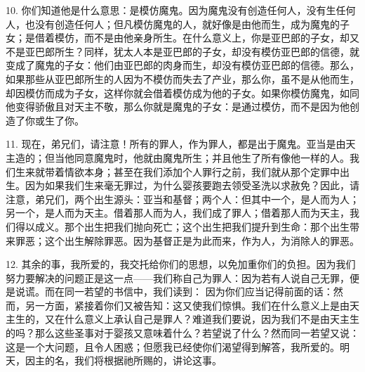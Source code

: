 10.  你们知道他是什么意思：是模仿魔鬼。因为魔鬼没有创造任何人，没有生任何人，也没有创造任何人；但凡模仿魔鬼的人，就好像是由他而生，成为魔鬼的子女；是借着模仿，而不是由他亲身所生。在什么意义上，你是亚巴郎的子女，却又不是亚巴郎所生？同样，犹太人本是亚巴郎的子女，却没有模仿亚巴郎的信德，就变成了魔鬼的子女：他们由亚巴郎的肉身而生，却没有模仿亚巴郎的信德。那么，如果那些从亚巴郎所生的人因为不模仿而失去了产业，那么你，虽不是从他而生，却因模仿而成为子女，这样你就会借着模仿成为他的子女。如果你模仿魔鬼，如同他变得骄傲且对天主不敬，那么你就是魔鬼的子女：是通过模仿，而不是因为他创造了你或生了你。\par

11. 现在，弟兄们，请注意！所有的罪人，作为罪人，都是出于魔鬼。亚当是由天主造的；但当他同意魔鬼时，他就由魔鬼所生；并且他生了所有像他一样的人。我们生来就带着情欲本身；甚至在我们添加个人罪行之前，我们就从那个定罪中出生。因为如果我们生来毫无罪过，为什么婴孩要跑去领受圣洗以求赦免？因此，请注意，弟兄们，两个出生源头：亚当和基督；两个人：但其中一个，是人而为人；另一个，是人而为天主。借着那人而为人，我们成了罪人；借着那人而为天主，我们得以成义。那个出生把我们抛向死亡；这个出生把我们提升到生命：那个出生带来罪恶；这个出生解除罪恶。因为基督正是为此而来，作为人，为消除人的罪恶。\par

12. 其余的事，我所爱的，我交托给你们的思想，以免加重你们的负担。因为我们努力要解决的问题正是这一点——我们称自己为罪人：因为若有人说自己无罪，便是说谎。而在同一若望的书信中，我们读到： 因为你们应当记得前面的话：然而，另一方面，紧接着你们又被告知：这又使我们惊惧。我们在什么意义上是由天主生的，又在什么意义上承认自己是罪人？难道我们要说，因为我们不是由天主生的吗？那么这些圣事对于婴孩又意味着什么？若望说了什么？然而同一若望又说：这是一个大问题，且令人困惑；但愿我已经使你们渴望得到解答，我所爱的。明天，因主的名，我们将根据祂所赐的，讲论这事。\par



